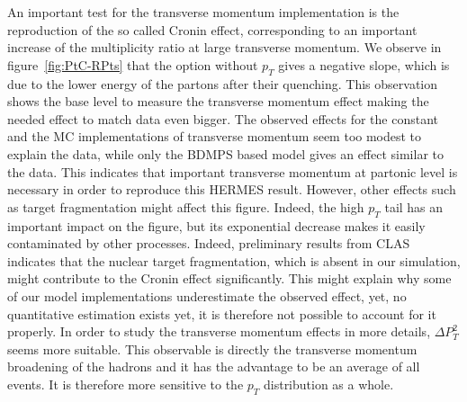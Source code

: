 An important test for the transverse momentum implementation is the 
reproduction of the so called Cronin effect, corresponding to an important 
increase of the multiplicity ratio at large transverse momentum. We observe in 
figure~\ref{fig:PtC-RPts} that the option without $p_T$ gives a negative slope, 
which is due to the lower energy of the partons after their quenching. This 
observation shows the base level to measure the transverse momentum effect 
making the needed effect to match data even bigger. The observed effects for 
the constant and the MC implementations of transverse momentum seem too modest 
to explain the data, while only the BDMPS based model gives an effect similar 
to the data. This indicates that important transverse momentum at partonic 
level is necessary in order to reproduce this HERMES result. However, other 
effects such as target fragmentation might affect this figure. Indeed, the high 
$p_T$ tail has an important impact on the figure, but its exponential decrease 
makes it easily contaminated by other processes. Indeed, preliminary results 
from CLAS \cite{dupre-th} indicates that the nuclear target fragmentation, 
which is absent in our simulation, might contribute to the Cronin effect 
significantly. This might explain why some of our model implementations 
underestimate the observed effect, yet, no quantitative estimation exists yet, 
it is therefore not possible to account for it properly. In order to study the 
transverse momentum effects in more details, $\Delta P_T^2$ seems more 
suitable. This observable is directly the transverse momentum broadening of the 
hadrons and it has the advantage to be an average of all events. It is 
therefore more sensitive to the $p_T$ distribution as a whole.

